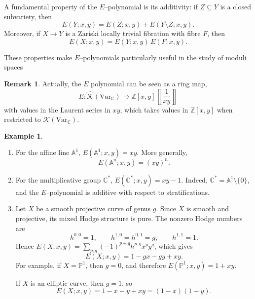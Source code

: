 \documentclass[12pt,reqno]{amsart}
\numberwithin{equation}{subsection}
\theoremstyle{definition}
\newtheorem{rem}[equation]{Remark}
\newtheorem{example}[equation]{Example}
\theoremstyle{theorem}
\begin{document}
A fundamental property of the \(E\)--polynomial is its additivity: if \(Z\subseteq Y\) is a closed subvariety, then
\[
E(Y;x,y)=E(Z;x,y)+E(Y\setminus Z;x,y).
\]
Moreover, if \(X\to Y\) is a Zariski locally trivial fibration with fibre \(F\), then
\[
E(X;x,y)=E(Y;x,y)\,E(F;x,y).
\]

These properties make \(E\)--polynomials particularly useful in the study of moduli spaces

\begin{rem}
Actually, the $E$ polynomial can be seen as a ring map,
\[E:\hat{\mathcal{K}}(\text{Var}_{\mathbb{C}})\rightarrow \mathbb{Z}[x,y] \left \llbracket \frac{1}{xy} \right\rrbracket\]with values in the Laurent series in $xy$, which takes values in $\mathbb{Z}[x,y]$ when restricted to $\mathcal{K}(\text{Var}_{\mathbb{C}})$.
\end{rem}

\begin{example}
	\begin{enumerate}
		\item For the affine line $\mathbb{A}^{1}$, $
		E(\mathbb{A}^{1};x,y)=xy.$
		 More generally, $$
		E(\mathbb{A}^{n};x,y)=(xy)^{n}.$$
		\item For the multiplicative group $\mathbb{C}^{*}$, $
		E(\mathbb{C}^{*};x,y)=xy-1$.
		Indeed, \(\mathbb{C}^{*}=\mathbb{A}^{1}\setminus \{0\}\), and the \(E\)--polynomial is additive with respect to stratifications.
		
		\item Let \(X\) be a smooth projective curve of genus \(g\). Since \(X\) is smooth and projective, its mixed Hodge structure is pure. The nonzero Hodge numbers are
		\[
		h^{0,0}=1,\qquad h^{1,0}=h^{0,1}=g,\qquad h^{1,1}=1.
		\]
		Hence $
		E(X;x,y)
		=
		\sum_{p,q}(-1)^{p+q}h^{p,q}x^{p}y^{q}$,
		which gives
		\[
		E(X;x,y)
		=
		1-gx-gy+xy.
		\]
		For example, if \(X=\mathbb{P}^{1}\), then \(g=0\), and therefore $
		E(\mathbb{P}^{1};x,y)=1+xy$.
		
		If $X$ is an elliptic curve, then \(g=1\), so
		\[
		E(X;x,y)=1-x-y+xy=(1-x)(1-y).
		\]
\end{enumerate}
\end{example}
\end{document}
